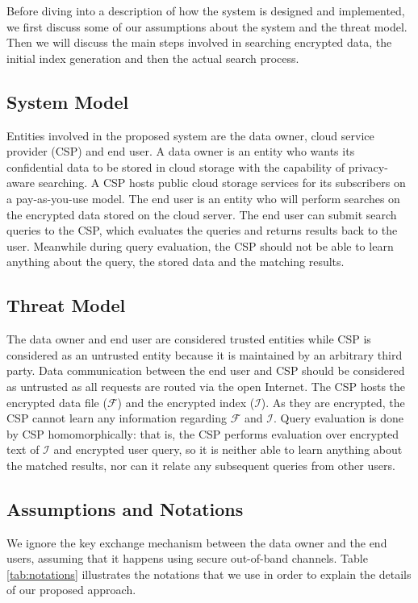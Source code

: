 Before diving into a description of how the system
is designed and implemented, we first discuss some of our assumptions
about the system and the threat model. Then we will discuss the main
steps involved in searching encrypted data, the initial index generation
and then the actual search process.

\subsection{System Model}

Entities involved in the proposed system are the data owner, cloud service provider (CSP) and end user.
A data owner is an entity who wants its confidential data to be stored in cloud storage with the capability of privacy-aware searching. 
A CSP hosts public cloud storage services for its subscribers on 
a pay-as-you-use model. The end user is an entity who will perform searches on the 
encrypted data stored on the cloud server. The end user can submit search queries 
to the CSP, which evaluates the queries and returns results back to the user. 
Meanwhile during query evaluation, the CSP should not be able to learn anything about the query, 
the stored data and the matching results.

\subsection{Threat Model}

The data owner and end user are considered trusted entities while CSP 
is considered as an untrusted entity because it is maintained by an 
arbitrary third party. Data communication between the end user and CSP should 
be considered as untrusted as all requests are routed via the open Internet. 
The CSP hosts the encrypted data file ($\mathcal{F}$) and the encrypted index ($\mathcal{I}$). 
As they are encrypted, the CSP cannot learn any information regarding $\mathcal{F}$ and $\mathcal{I}$. 
Query evaluation is done by CSP homomorphically: that is, the CSP performs 
evaluation over encrypted text of $\mathcal{I}$ and encrypted user query, 
so it is neither able to learn anything about the matched results, nor
can it relate any subsequent queries from other users. 

\subsection{Assumptions and Notations}

We ignore the key exchange mechanism between the data owner and the end users, assuming
that it happens using secure out-of-band channels.
Table \ref{tab:notations} illustrates the notations that we use in order to explain
the details of our proposed approach.


